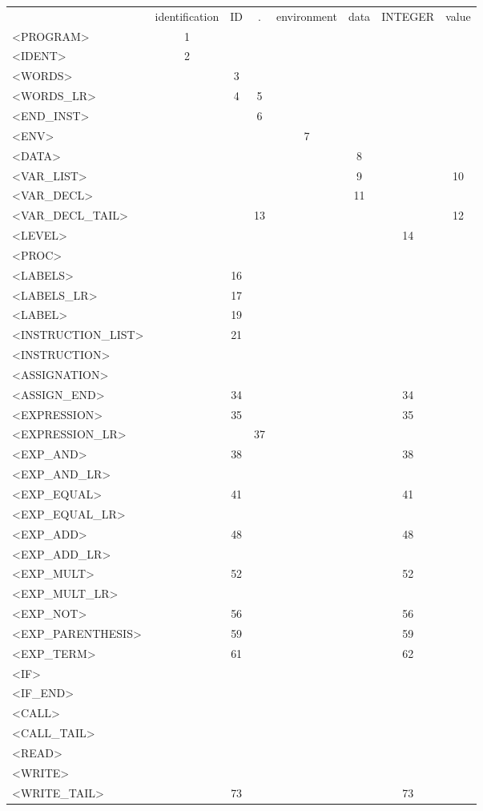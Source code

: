 \documentclass[a4paper,11pt]{article}
\begin{document}
\begin{longtable}{l||ccccccc}
	& identification & ID & . & environment & data & INTEGER & value\\
	<PROGRAM> & 1 & & & & & & \\
	<IDENT> & 2 & & & & & & \\
	<WORDS> &  & 3 & & & & & \\
	<WORDS\_LR> & & 4 & 5 & & & & \\
	<END\_INST> & & & 6 & & & & \\
	<ENV> & & & & 7 & & & \\
	<DATA> & & & & & 8 & & \\
	<VAR\_LIST> & & & & & 9 & & 10 \\
	<VAR\_DECL> & & & & & 11 & & \\
	<VAR\_DECL\_TAIL> & & & 13 & & & & 12 \\
	<LEVEL> & & & & & & 14 & \\
	<PROC> & & & & & & & \\
	<LABELS> & & 16 & & & & & \\
	<LABELS\_LR> & & 17 & & & & & \\
	<LABEL> & & 19 & & & & & \\
	<INSTRUCTION\_LIST> & & 21 & & & & & \\
	<INSTRUCTION> & & & & & & & \\
	<ASSIGNATION> & & & & & & & \\
	<ASSIGN\_END> & & 34 & & & & 34 & \\
	<EXPRESSION> & & 35 & & & & 35 & \\
	<EXPRESSION\_LR> & & & 37 & & & & \\
	<EXP\_AND> & & 38 & & & & 38 & \\
	<EXP\_AND\_LR> & & & & & & & \\
	<EXP\_EQUAL> & & 41 & & & & 41 & \\
	<EXP\_EQUAL\_LR> & & & & & & & \\
	<EXP\_ADD> & & 48 & & & & 48 & \\
	<EXP\_ADD\_LR> & & & & & & & \\
	<EXP\_MULT> & & 52 & & & & 52 & \\
	<EXP\_MULT\_LR> & & & & & & & \\
	<EXP\_NOT> & & 56 & & & & 56 & \\
	<EXP\_PARENTHESIS> & & 59 & & & & 59 & \\
	<EXP\_TERM> & & 61 & & & & 62 & \\
	<IF> & & & & & & & \\
	<IF\_END> & & & & & & & \\
	<CALL> & & & & & & & \\
	<CALL\_TAIL> & & & & & & & \\
	<READ> & & & & & & & \\
	<WRITE> & & & & & & & \\
	<WRITE\_TAIL> & & 73 & & & & 73 & \\
\end{longtable}
\end{document}
